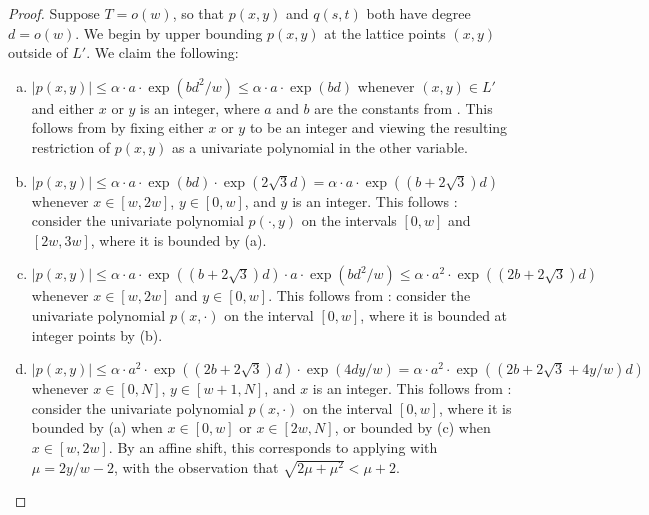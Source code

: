 \begin{proof}
Suppose $T = o(w)$, so that $p(x, y)$ and $q(s, t)$ both have degree $d=o(w)$. We begin by upper bounding $p(x, y)$ at the lattice points $(x, y)$ outside of $L'$. 
We claim the following:
\begin{enumerate}[(a)]
\item $|p(x, y)| \le \alpha \cdot a \cdot \exp(bd^2 / w) \le \alpha \cdot a \cdot \exp(bd)$ whenever $(x, y) \in L'$ and either $x$ or $y$ is an integer, where $a$
and $b$ are the constants from . This follows from  by fixing either $x$ or $y$ to be an integer and viewing the resulting restriction of $p(x, y)$ as a univariate polynomial in the other variable.
\item $|p(x, y)| \le \alpha \cdot a \cdot \exp(bd) \cdot \exp(2\sqrt{3}d) = \alpha \cdot a \cdot \exp((b + 2\sqrt{3})d)$ whenever $x \in [w, 2w]$, $y \in [0, w]$, and $y$ is an integer. This follows : consider the univariate polynomial $p(\cdot, y)$ on the intervals $[0, w]$ and $[2w, 3w]$, where it is bounded by (a).
\item $|p(x, y)| \le \alpha \cdot a \cdot \exp((b + 2\sqrt{3})d) \cdot a \cdot \exp(bd^2/w) \le \alpha \cdot a^2 \cdot \exp((2b + 2\sqrt{3})d)$ whenever $x \in [w, 2w]$ and $y \in [0, w]$. This follows from : consider the univariate polynomial $p(x, \cdot)$ on the interval $[0, w]$, where it is bounded at integer points by (b).
\item $|p(x, y)| \le \alpha \cdot a^2 \cdot \exp((2b + 2\sqrt{3})d) \cdot \exp(4dy/w) = \alpha \cdot a^2 \cdot \exp((2b + 2\sqrt{3} + 4y/w)d)$ whenever $x \in [0, N]$, $y \in [w + 1, N]$, and $x$ is an integer. This follows from  : consider the univariate polynomial $p(x, \cdot)$ on the interval $[0, w]$, where it is bounded by (a) when $x \in [0, w]$ or $x \in [2w, N]$, or bounded by (c) when $x \in [w, 2w]$. 
By an affine shift, this corresponds to applying  with $\mu = 2y/w - 2$, with the observation that $\sqrt{2\mu + \mu^2} < \mu + 2$.
\end{enumerate}


\end{proof}
